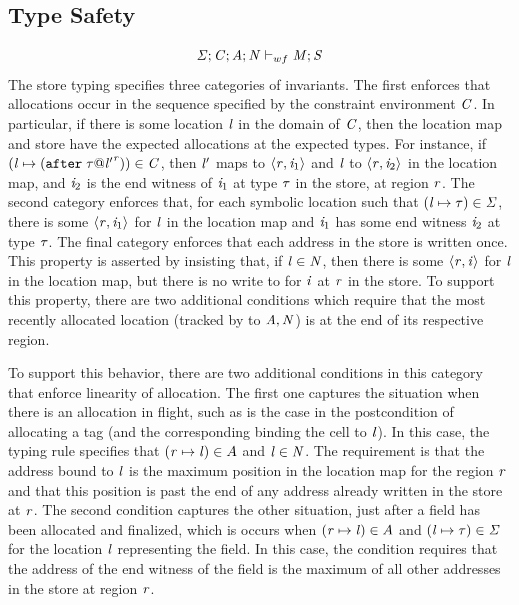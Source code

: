 \documentclass[showabstract,showacknowledgments,showpreface,showdedication]{iuphd}
\theoremstyle{nonumberplain}
\begin{document}
\subsection{Type Safety}

%
\begin{displaymath}
  \mathit{\Sigma};\mathit{C};\mathit{A};\mathit{N} \vdash_{wf} \mathit{M};\mathit{S}
\end{displaymath}
%
The store typing specifies three categories of invariants.
%
The first enforces that allocations occur in the sequence
specified by the constraint environment $\mathit{C}$.
%
In particular, if there is some location $\mathit{l}$ in the domain of
$\mathit{C}$, then the location map and store have the expected
allocations at the expected types.
%
For instance, if $(\mathit{l} \mapsto
(\texttt{after}\; \mathit{\tau} @ {\mathit{l}'}^{\mathit{r}})) \in \mathit{C}$, then $\mathit{l}'$ maps
to $\langle \mathit{r}, \mathit{i}_1 \rangle ^{}$ and $\mathit{l}$ to
$\langle \mathit{r}, \mathit{i}_2 \rangle ^{}$ in the location map, and $\mathit{i}_2$ is
the end witness of $\mathit{i}_1$ at type $\mathit{\tau}$ in the store, at region
$\mathit{r}$.
%
The second category enforces that, for each symbolic location such
that $(\mathit{l} \mapsto \mathit{\tau}) \in \mathit{\Sigma}$, there is some
$\langle \mathit{r}, \mathit{i}_1 \rangle ^{}$ for $\mathit{l}$ in the location map and
$\mathit{i}_1$ has some end witness $\mathit{i}_2$ at type $\mathit{\tau}$.
%
The final category enforces that each address in the store is written
once.
%
This property is asserted by insisting that, if $\mathit{l} \in \mathit{N}$, then
there is some $\langle \mathit{r}, \mathit{i} \rangle ^{}$ for $\mathit{l}$ in the location
map, but there is no write to for $\mathit{i}$ at $\mathit{r}$ in the store.
%
To support this property, there are two additional conditions which
require that the most recently allocated location (tracked by
to $\mathit{A}, \mathit{N}$) is at the end of its respective region.

To support this behavior, there are two additional conditions in this
category that enforce linearity of allocation.
%
The first one captures the situation when there is an allocation in
flight, such as is the case in the postcondition of allocating
a tag (and the corresponding binding the cell to $\mathit{l}$).
%
In this case, the typing rule specifies that $(\mathit{r} \mapsto \mathit{l}) \in
A$ and $\mathit{l} \in \mathit{N}$.
%
The requirement is that the address bound to $\mathit{l}$ is the maximum
position in the location map for the region $\mathit{r}$ and that this
position is past the end of any address already written in the store
at $\mathit{r}$.
The second condition captures the other situation, just after
a field has been allocated and finalized, which is occurs
when $(\mathit{r} \mapsto \mathit{l}) \in A$ and $(\mathit{l} \mapsto \mathit{\tau}) \in \mathit{\Sigma}$
for the location $\mathit{l}$ representing the field.
%
In this case, the condition requires that the address of the end
witness of the field is the maximum of all other addresses in the
store at region $\mathit{r}$.
\end{document}

